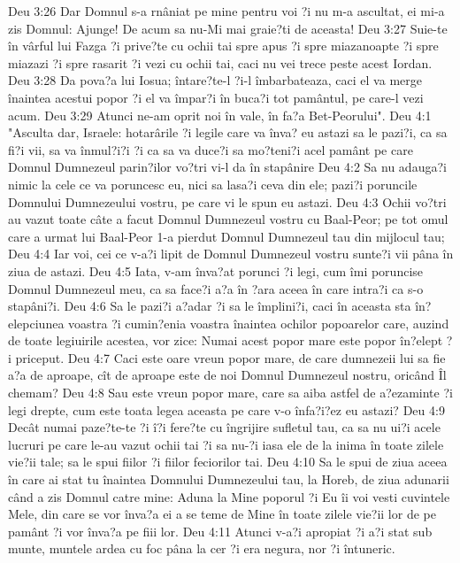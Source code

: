 Deu 3:26  Dar Domnul s-a rnâniat pe mine pentru voi ?i nu m-a ascultat, ei mi-a zis Domnul: Ajunge! De acum sa nu-Mi mai graie?ti de aceasta!
Deu 3:27  Suie-te în vârful lui Fazga ?i prive?te cu ochii tai spre apus ?i spre miazanoapte ?i spre miazazi ?i spre rasarit ?i vezi cu ochii tai, caci nu vei trece peste acest Iordan.
Deu 3:28  Da pova?a lui Iosua; întare?te-l ?i-l îmbarbateaza, caci el va merge înaintea acestui popor ?i el va împar?i în buca?i tot pamântul, pe care-l vezi acum.
Deu 3:29  Atunci ne-am oprit noi în vale, în fa?a Bet-Peorului".
Deu 4:1  "Asculta dar, Israele: hotarârile ?i legile care va înva? eu astazi sa le pazi?i, ca sa fi?i vii, sa va înmul?i?i ?i ca sa va duce?i sa mo?teni?i acel pamânt pe care Domnul Dumnezeul parin?ilor vo?tri vi-l da în stapânire
Deu 4:2  Sa nu adauga?i nimic la cele ce va poruncesc eu, nici sa lasa?i ceva din ele; pazi?i poruncile Domnului Dumnezeului vostru, pe care vi le spun eu astazi.
Deu 4:3  Ochii vo?tri au vazut toate câte a facut Domnul Dumnezeul vostru cu Baal-Peor; pe tot omul care a urmat lui Baal-Peor 1-a pierdut Domnul Dumnezeul tau din mijlocul tau;
Deu 4:4  Iar voi, cei ce v-a?i lipit de Domnul Dumnezeul vostru sunte?i vii pâna în ziua de astazi.
Deu 4:5  Iata, v-am înva?at porunci ?i legi, cum îmi poruncise Domnul Dumnezeul meu, ca sa face?i a?a în ?ara aceea în care intra?i ca s-o stapâni?i.
Deu 4:6  Sa le pazi?i a?adar ?i sa le împlini?i, caci în aceasta sta în?elepciunea voastra ?i cumin?enia voastra înaintea ochilor popoarelor care, auzind de toate legiuirile acestea, vor zice: Numai acest popor mare este popor în?elept ?i priceput.
Deu 4:7  Caci este oare vreun popor mare, de care dumnezeii lui sa fie a?a de aproape, cît de aproape este de noi Domnul Dumnezeul nostru, oricând Îl chemam?
Deu 4:8  Sau este vreun popor mare, care sa aiba astfel de a?ezaminte ?i legi drepte, cum este toata legea aceasta pe care v-o înfa?i?ez eu astazi?
Deu 4:9  Decât numai paze?te-te ?i î?i fere?te cu îngrijire sufletul tau, ca sa nu ui?i acele lucruri pe care le-au vazut ochii tai ?i sa nu-?i iasa ele de la inima în toate zilele vie?ii tale; sa le spui fiilor ?i fiilor feciorilor tai.
Deu 4:10  Sa le spui de ziua aceea în care ai stat tu înaintea Domnului Dumnezeului tau, la Horeb, de ziua adunarii când a zis Domnul catre mine: Aduna la Mine poporul ?i Eu îi voi vesti cuvintele Mele, din care se vor înva?a ei a se teme de Mine în toate zilele vie?ii lor de pe pamânt ?i vor înva?a pe fiii lor.
Deu 4:11  Atunci v-a?i apropiat ?i a?i stat sub munte, muntele ardea cu foc pâna la cer ?i era negura, nor ?i întuneric.
